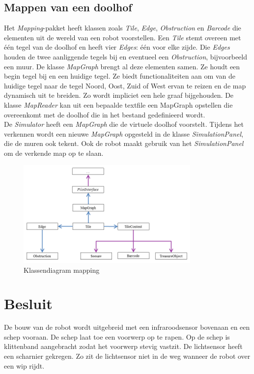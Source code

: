 \documentclass[tt2]{penoverslag}
\begin{document}
\subsection{Mappen van een doolhof} %
\label{ssec:mapping}
Het \textit{Mapping}-pakket heeft klassen zoals \textit{Tile}, \textit{Edge}, \textit{Obstruction} en \textit{Barcode} die elementen uit de wereld van een robot voorstellen.  Een \textit{Tile} stemt overeen met \'e\'en tegel van de doolhof en heeft vier \textit{Edges}: \'e\'en voor elke zijde. Die \textit{Edges} houden de twee aanliggende tegels bij en eventueel een \textit{Obstruction}, bijvoorbeeld een muur. De klasse \textit{MapGraph} brengt al deze elementen samen. Ze houdt een begin tegel bij en een huidige tegel. Ze biedt functionaliteiten aan om van de huidige tegel naar de tegel Noord, Oost, Zuid of West ervan te reizen en de map dynamisch uit te breiden. Zo wordt impliciet een hele graaf bijgehouden. De klasse \textit{MapReader} kan uit een bepaalde textfile een MapGraph opstellen die overeenkomt met de doolhof die in het bestand gedefinieerd wordt.\\

De \textit{Simulator} heeft een \textit{MapGraph} die de virtuele doolhof voorstelt. Tijdens het verkennen wordt een nieuwe \textit{MapGraph} opgesteld in de klasse \textit{SimulationPanel}, die de muren ook tekent. Ook de robot maakt gebruik van het \textit{SimulationPanel} om de verkende map op te slaan.

\begin{figure}[h]
\centering
	\includegraphics[width=0.8\textwidth]{klasMapping}
\caption{Klassendiagram mapping}
\label{fig:KlasMap}
\end{figure}


\section{Besluit}
De bouw van de robot wordt uitgebreid met een infraroodsensor bovenaan en een schep vooraan. De schep laat toe een voorwerp op te rapen. Op de schep is klittenband aangebracht zodat het voorwerp stevig vastzit. De lichtsensor heeft een scharnier gekregen. Zo zit de lichtsensor niet in de weg wanneer de robot over een wip rijdt. \\
\end{document}
